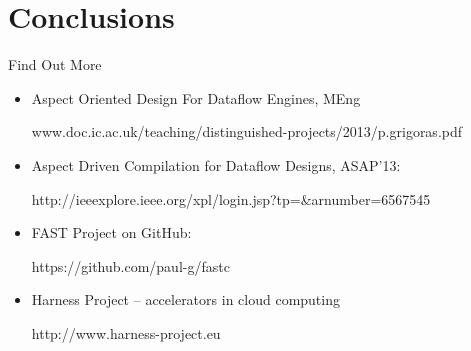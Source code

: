 \section{Conclusions}
\begin{frame}{Find Out More}
\begin{itemize}
    \setlength{\itemsep}{15pt}
\item Aspect Oriented Design For Dataflow Engines, MEng

  {\scriptsize \textcolor{UniBlue}{www.doc.ic.ac.uk/teaching/distinguished-projects/2013/p.grigoras.pdf}}

\item Aspect Driven Compilation for Dataflow Designs, ASAP'13:

  {\scriptsize \textcolor{UniBlue}{http://ieeexplore.ieee.org/xpl/login.jsp?tp=\&arnumber=6567545}}

\item FAST Project on GitHub:

  {\scriptsize \textcolor{UniBlue}{https://github.com/paul-g/fastc}}

\item Harness Project -- accelerators in cloud computing

  {\scriptsize \textcolor{UniBlue}{http://www.harness-project.eu}}
\end{itemize}

\end{frame}

